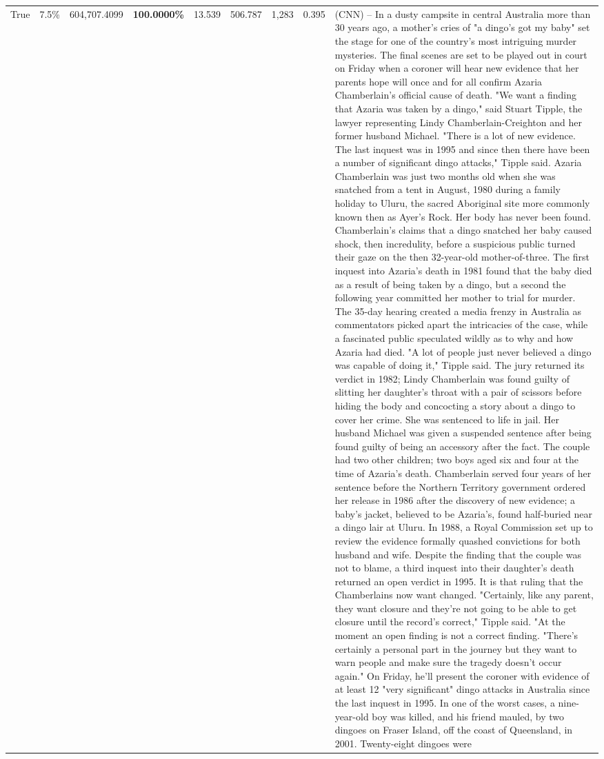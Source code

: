 \begin{table}[H]
\begin{tabular}{lllrlllll}
True & 7.5\% & 604,707.4099 & \bfseries \color{red} 100.0000\% & 13.539 & 506.787 & 1,283 & 0.395 & (CNN) -- In a dusty campsite in central Australia more than 30 years ago, a mother's cries of "a dingo's got my baby" set the stage for one of the country's most intriguing murder mysteries. The final scenes are set to be played out in court on Friday when a coroner will hear new evidence that her parents hope will once and for all confirm Azaria Chamberlain's official cause of death. "We want a finding that Azaria was taken by a dingo," said Stuart Tipple, the lawyer representing Lindy Chamberlain-Creighton and her former husband Michael. "There is a lot of new evidence. The last inquest was in 1995 and since then there have been a number of significant dingo attacks," Tipple said. Azaria Chamberlain was just two months old when she was snatched from a tent in August, 1980 during a family holiday to Uluru, the sacred Aboriginal site more commonly known then as Ayer's Rock. Her body has never been found. Chamberlain's claims that a dingo snatched her baby caused shock, then incredulity, before a suspicious public turned their gaze on the then 32-year-old mother-of-three. The first inquest into Azaria's death in 1981 found that the baby died as a result of being taken by a dingo, but a second the following year committed her mother to trial for murder. The 35-day hearing created a media frenzy in Australia as commentators picked apart the intricacies of the case, while a fascinated public speculated wildly as to why and how Azaria had died. "A lot of people just never believed a dingo was capable of doing it," Tipple said. The jury returned its verdict in 1982; Lindy Chamberlain was found guilty of slitting her daughter's throat with a pair of scissors before hiding the body and concocting a story about a dingo to cover her crime. She was sentenced to life in jail. Her husband Michael was given a suspended sentence after being found guilty of being an accessory after the fact. The couple had two other children; two boys aged six and four at the time of Azaria's death. Chamberlain served four years of her sentence before the Northern Territory government ordered her release in 1986 after the discovery of new evidence; a baby's jacket, believed to be Azaria's, found half-buried near a dingo lair at Uluru. In 1988, a Royal Commission set up to review the evidence formally quashed convictions for both husband and wife. Despite the finding that the couple was not to blame, a third inquest into their daughter's death returned an open verdict in 1995. It is that ruling that the Chamberlains now want changed. "Certainly, like any parent, they want closure and they're not going to be able to get closure until the record's correct," Tipple said. "At the moment an open finding is not a correct finding. "There's certainly a personal part in the journey but they want to warn people and make sure the tragedy doesn't occur again." On Friday, he'll present the coroner with evidence of at least 12 "very significant" dingo attacks in Australia since the last inquest in 1995. In one of the worst cases, a nine-year-old boy was killed, and his friend mauled, by two dingoes on Fraser Island, off the coast of Queensland, in 2001. Twenty-eight dingoes were 
\end{tabular}
\end{table}
